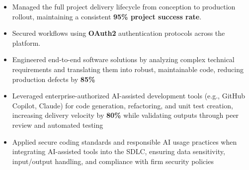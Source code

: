\begin{itemize}
\item {Managed the full project delivery lifecycle from conception to production rollout, maintaining a consistent \textbf{95\% project success rate}.}
\item {Secured workflows using \textbf{OAuth2} authentication protocols across the platform.}
\item Engineered end-to-end software solutions by analyzing complex technical requirements and translating them into robust, maintainable code, reducing production defects by \textbf{85\%}
\item Leveraged enterprise-authorized AI-assisted development tools (e.g., GitHub Copilot, Claude) for code generation, refactoring, and unit test creation, increasing delivery velocity by \textbf{80\%} while validating outputs through peer review and automated testing
\item Applied secure coding standards and responsible AI usage practices when integrating AI-assisted tools into the SDLC, ensuring data sensitivity, input/output handling, and compliance with firm security policies
\end{itemize}




